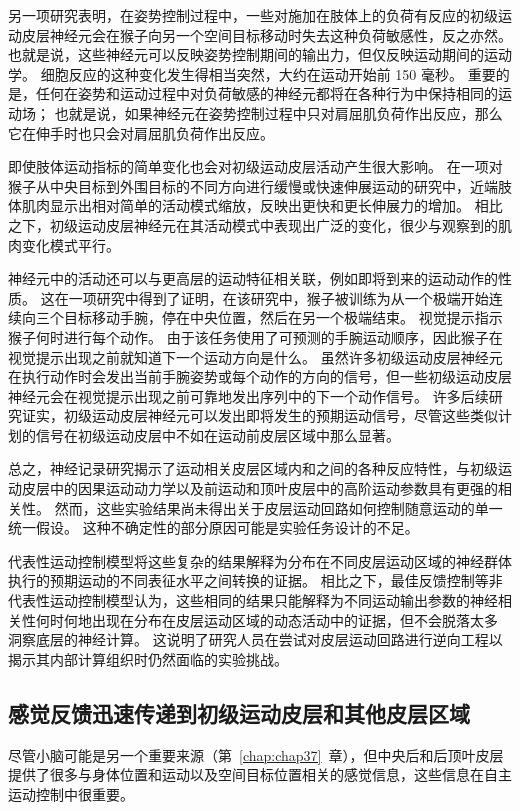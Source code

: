另一项研究表明，在姿势控制过程中，一些对施加在肢体上的负荷有反应的初级运动皮层神经元会在猴子向另一个空间目标移动时失去这种负荷敏感性，反之亦然。
也就是说，这些神经元可以反映姿势控制期间的输出力，但仅反映运动期间的运动学。
细胞反应的这种变化发生得相当突然，大约在运动开始前 150 毫秒。
重要的是，任何在姿势和运动过程中对负荷敏感的神经元都将在各种行为中保持相同的运动场；
也就是说，如果神经元在姿势控制过程中只对肩屈肌负荷作出反应，那么它在伸手时也只会对肩屈肌负荷作出反应。


即使肢体运动指标的简单变化也会对初级运动皮层活动产生很大影响。
在一项对猴子从中央目标到外围目标的不同方向进行缓慢或快速伸展运动的研究中，近端肢体肌肉显示出相对简单的活动模式缩放，反映出更快和更长伸展力的增加。
相比之下，初级运动皮层神经元在其活动模式中表现出广泛的变化，很少与观察到的肌肉变化模式平行。


神经元中的活动还可以与更高层的运动特征相关联，例如即将到来的运动动作的性质。 
这在一项研究中得到了证明，在该研究中，猴子被训练为从一个极端开始连续向三个目标移动手腕，停在中央位置，然后在另一个极端结束。
视觉提示指示猴子何时进行每个动作。
由于该任务使用了可预测的手腕运动顺序，因此猴子在视觉提示出现之前就知道下一个运动方向是什么。
虽然许多初级运动皮层神经元在执行动作时会发出当前手腕姿势或每个动作的方向的信号，但一些初级运动皮层神经元会在视觉提示出现之前可靠地发出序列中的下一个动作信号。
许多后续研究证实，初级运动皮层神经元可以发出即将发生的预期运动信号，尽管这些类似计划的信号在初级运动皮层中不如在运动前皮层区域中那么显著。


总之，神经记录研究揭示了运动相关皮层区域内和之间的各种反应特性，与初级运动皮层中的因果运动动力学以及前运动和顶叶皮层中的高阶运动参数具有更强的相关性。
然而，这些实验结果尚未得出关于皮层运动回路如何控制随意运动的单一统一假设。
这种不确定性的部分原因可能是实验任务设计的不足。


代表性运动控制模型将这些复杂的结果解释为分布在不同皮层运动区域的神经群体执行的预期运动的不同表征水平之间转换的证据。
相比之下，最佳反馈控制等非代表性运动控制模型认为，这些相同的结果只能解释为不同运动输出参数的神经相关性何时何地出现在分布在皮层运动区域的动态活动中的证据，但不会脱落太多 洞察底层的神经计算。
这说明了研究人员在尝试对皮层运动回路进行逆向工程以揭示其内部计算组织时仍然面临的实验挑战。



\subsection{感觉反馈迅速传递到初级运动皮层和其他皮层区域}

尽管小脑可能是另一个重要来源（第~\ref{chap:chap37}~章），但中央后和后顶叶皮层提供了很多与身体位置和运动以及空间目标位置相关的感觉信息，这些信息在自主运动控制中很重要。


